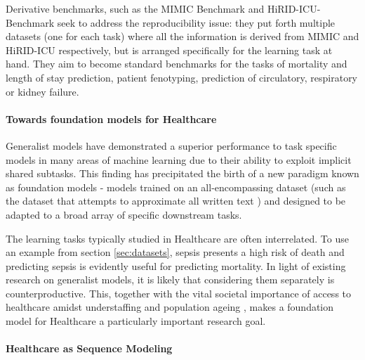 Derivative benchmarks, such as the MIMIC Benchmark \cite{harutyunyanMultitaskLearningBenchmarking2019} and HiRID-ICU-Benchmark \cite{yecheHiRIDICUBenchmarkComprehensiveMachine} seek to address the reproducibility issue: they put forth multiple datasets (one for each task) where all the information is derived from MIMIC and HiRID-ICU respectively, but is arranged specifically for the learning task at hand. They aim to become standard benchmarks for the tasks of mortality and length of stay prediction, patient fenotyping, prediction of circulatory, respiratory or kidney failure.

\paragraph{Towards foundation models for Healthcare}

Generalist models have demonstrated a superior performance to task specific models in many areas of machine learning \cite{reedGeneralistAgent2022} due to their ability to exploit implicit shared subtasks. 
This finding has precipitated the birth of a new paradigm known as foundation models \cite{zhouComprehensiveSurveyPretrained2023} - models trained on an all-encompassing dataset (such as the dataset that attempts to approximate all written text \cite{chelbaOneBillionWord2013}) and designed to be adapted to a broad array of specific downstream tasks.

The learning tasks typically studied in Healthcare are often interrelated. 
To use an example from section \ref{sec:datasets}, sepsis presents a high risk of death \cite{schlichtingRecognizingManagingSevere2007} and predicting sepsis is evidently useful for predicting mortality.
In light of existing research on generalist models, it is likely that considering them separately is counterproductive.
This, together with the vital societal importance of access to healthcare amidst understaffing \cite{ashleyy.metcalfHospitalUnitUnderstaffing2016, hudsonUnderstaffing2015, mercerMessageEditorinChief2008, munnUnderstaffingWardsCompromising2017, r.stanleyUnderstaffedOverwhelmed2010, SurveyShowsHidden1993, thelancetHealthcareSystemStaffing2018, UnderstaffingSignificantIssue2012} and population ageing \cite{2012health, Aslam2021Ageing, L1991aging, Lloyd2012Population, Mahishale2015Ageing, Mann2004aging, Sammy2019global, Suzman2015Health}, makes a foundation model for Healthcare a particularly important research goal.

\paragraph{Healthcare as Sequence Modeling}
\label{sec:sequencemodel}

